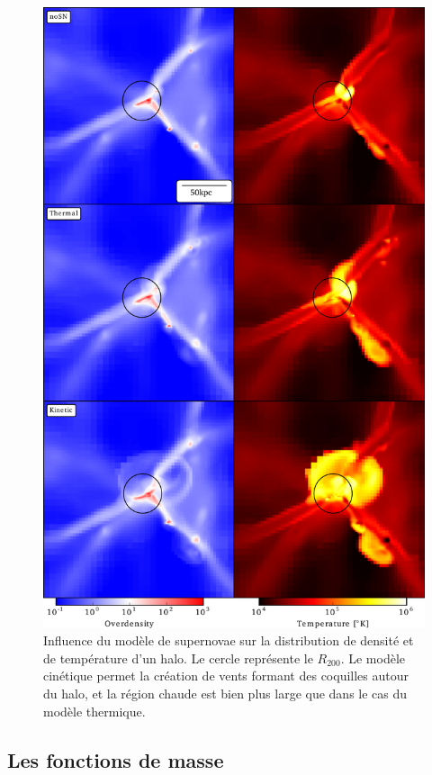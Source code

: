 \begin{figure}
		\includegraphics[width=.95\linewidth]{img/03/halos.pdf}
        \caption[Influence du modèle de supernovae sur la forme des halos]{Influence du modèle de supernovae sur la distribution de densité et de température d'un halo.
        Le cercle représente le $R_{200}$.
        Le modèle cinétique permet la création de vents formant des coquilles autour du halo, et la région chaude est bien plus large que dans le cas du modèle thermique.
 		\label{fig:halo}}
\end{figure}


\subsection{Les fonctions de masse}
\label{sec:hmf}


